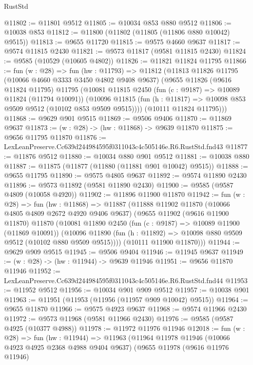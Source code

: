 \begin{lexlean}{RustStd}
\begin{coremodule}
@11802 := @11801 @9512
@11805 := @10034 @853 @880 @9512
@11806 := @10038 @853
@11812 := @11800 (@11802 (@11805 (@11806 @880 @10042) @9515))
@11813 := @9655 @11720
@11815 := @9575 @4660 @9637
@11817 := @9574 @11815 @2430
@11821 := @9573 @11817 (@9581 @11815 @2430)
@11824 := @9585 (@10529 (@10605 @4802))
@11826 := @11821 @11824 @11795
@11866 := fun (w : @28) =>
  fun (hw : @11793) =>
  @11812
    (@11813
      @11826
      @11795
      (@10066 @4660 @3333 @3450 @4802 @9408 @9637)
      (@9655
        @11826
        (@9616 @11824 @11795)
        @11795
        (@10081
          @11815
          @2450
          (fun (c : @9187) => @10089 @11824 (@11794 @10091))
          (@10096 @11815 (fun (h : @11817) => @10098 @853 @9509 @9512 (@10102 @853 @9509 @9515))))
        (@10111 @11824 @11795)))
@11868 := @9629 @901 @9515
@11869 := @9506 @9406
@11870 := @11869 @9637
@11873 := (w : @28) -> (hw : @11868) -> @9639 @11870
@11875 := @9656 @11795 @11870
@11876 := LexLeanPreserve.Cc639d244984595f0311043c4c505146e.R6.RustStd.fnd43
@11877 := @11876 @9512
@11880 := @10034 @880 @901 @9512
@11881 := @10038 @880
@11887 := @11875 (@11877 (@11880 (@11881 @901 @10042) @9515))
@11888 := @9655 @11795
@11890 := @9575 @4805 @9637
@11892 := @9574 @11890 @2430
@11896 := @9573 @11892 (@9581 @11890 @2430)
@11900 := @9585 (@9587 @4809 (@10058 @4920))
@11902 := @11896 @11900 @11870
@11942 := fun (w : @28) =>
  fun (hw : @11868) =>
  @11887
    (@11888
      @11902
      @11870
      (@10066 @4805 @4809 @2672 @4920 @9406 @9637)
      (@9655
        @11902
        (@9616 @11900 @11870)
        @11870
        (@10081
          @11890
          @2450
          (fun (c : @9187) => @10089 @11900 (@11869 @10091))
          (@10096 @11890 (fun (h : @11892) => @10098 @880 @9509 @9512 (@10102 @880 @9509 @9515))))
        (@10111 @11900 @11870)))
@11944 := @9629 @909 @9515
@11945 := @9506 @9404
@11946 := @11945 @9637
@11949 := (w : @28) -> (hw : @11944) -> @9639 @11946
@11951 := @9656 @11870 @11946
@11952 := LexLeanPreserve.Cc639d244984595f0311043c4c505146e.R6.RustStd.fnd44
@11953 := @11952 @9512
@11956 := @10034 @901 @909 @9512
@11957 := @10038 @901
@11963 := @11951 (@11953 (@11956 (@11957 @909 @10042) @9515))
@11964 := @9655 @11870
@11966 := @9575 @4923 @9637
@11968 := @9574 @11966 @2430
@11972 := @9573 @11968 (@9581 @11966 @2430)
@11976 := @9585 (@9587 @4925 (@10377 @4988))
@11978 := @11972 @11976 @11946
@12018 := fun (w : @28) =>
  fun (hw : @11944) =>
  @11963
    (@11964
      @11978
      @11946
      (@10066 @4923 @4925 @2368 @4988 @9404 @9637)
      (@9655
        @11978
        (@9616 @11976 @11946)

\end{coremodule}
\end{lexlean}
